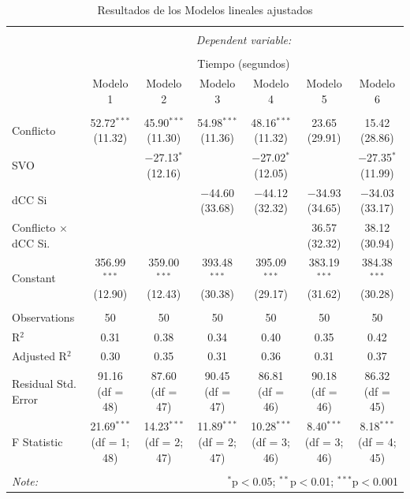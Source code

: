 \documentclass[
  spanish,
  10pt,
]{article}
\begin{document}
\begin{table}[H] \centering 
  \caption{Resultados de los Modelos lineales ajustados} 
  \label{} 
\scriptsize 
\begin{tabular}{@{\extracolsep{5pt}}lcccccc} 
\\[-1.8ex]\hline 
\hline \\[-1.8ex] 
 & \multicolumn{6}{c}{\textit{Dependent variable:}} \\ 
\cline{2-7} 
\\[-1.8ex] & \multicolumn{6}{c}{Tiempo (segundos)} \\ 
 & Modelo 1 & Modelo 2 & Modelo 3 & Modelo 4 & Modelo 5 & Modelo 6 \\ 
\hline \\[-1.8ex] 
 Conflicto & 52.72$^{***}$ (11.32) & 45.90$^{***}$ (11.30) & 54.98$^{***}$ (11.36) & 48.16$^{***}$ (11.32) & 23.65 (29.91) & 15.42 (28.86) \\ 
  SVO &  & $-$27.13$^{*}$ (12.16) &  & $-$27.02$^{*}$ (12.05) &  & $-$27.35$^{*}$ (11.99) \\ 
  dCC Si &  &  & $-$44.60 (33.68) & $-$44.12 (32.32) & $-$34.93 (34.65) & $-$34.03 (33.17) \\ 
  Conflicto $\times$ dCC Si. &  &  &  &  & 36.57 (32.32) & 38.12 (30.94) \\ 
  Constant & 356.99$^{***}$ (12.90) & 359.00$^{***}$ (12.43) & 393.48$^{***}$ (30.38) & 395.09$^{***}$ (29.17) & 383.19$^{***}$ (31.62) & 384.38$^{***}$ (30.28) \\ 
 \hline \\[-1.8ex] 
Observations & 50 & 50 & 50 & 50 & 50 & 50 \\ 
R$^{2}$ & 0.31 & 0.38 & 0.34 & 0.40 & 0.35 & 0.42 \\ 
Adjusted R$^{2}$ & 0.30 & 0.35 & 0.31 & 0.36 & 0.31 & 0.37 \\ 
Residual Std. Error & 91.16 (df = 48) & 87.60 (df = 47) & 90.45 (df = 47) & 86.81 (df = 46) & 90.18 (df = 46) & 86.32 (df = 45) \\ 
F Statistic & 21.69$^{***}$ (df = 1; 48) & 14.23$^{***}$ (df = 2; 47) & 11.89$^{***}$ (df = 2; 47) & 10.28$^{***}$ (df = 3; 46) & 8.40$^{***}$ (df = 3; 46) & 8.18$^{***}$ (df = 4; 45) \\ 
\hline 
\hline \\[-1.8ex] 
\textit{Note:}  & \multicolumn{6}{r}{$^{*}$p$<$0.05; $^{**}$p$<$0.01; $^{***}$p$<$0.001} \\ 
\end{tabular} 
\end{table}
\end{document}
